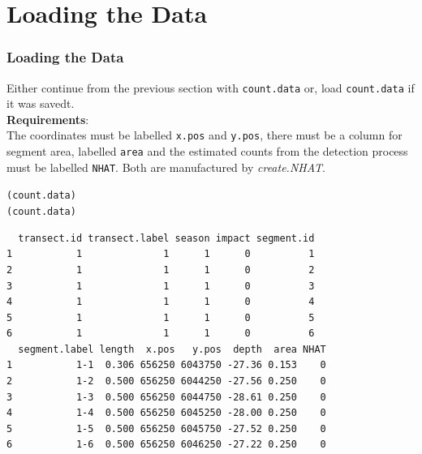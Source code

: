 \section{Loading the Data}
\begin{frame}[fragile]
\frametitle{Loading the Data}
Either continue from the previous section with {\tt count.data} or, load {\tt count.data} if it was savedt.\\

\noindent \textbf{Requirements}:\\

\noindent The coordinates must be labelled {\tt x.pos} and {\tt y.pos}, there must be a column for segment area, labelled {\tt area} and the estimated counts from the detection process must be labelled {\tt NHAT}. Both are manufactured by \textit{create.NHAT}.
\begin{knitrout}\footnotesize
{}\color{fgcolor}\begin{kframe}
\begin{alltt}
(count.data)
(count.data)
\end{alltt}
\begin{verbatim}
  transect.id transect.label season impact segment.id
1           1              1      1      0          1
2           1              1      1      0          2
3           1              1      1      0          3
4           1              1      1      0          4
5           1              1      1      0          5
6           1              1      1      0          6
  segment.label length  x.pos   y.pos  depth  area NHAT
1           1-1  0.306 656250 6043750 -27.36 0.153    0
2           1-2  0.500 656250 6044250 -27.56 0.250    0
3           1-3  0.500 656250 6044750 -28.61 0.250    0
4           1-4  0.500 656250 6045250 -28.00 0.250    0
5           1-5  0.500 656250 6045750 -27.52 0.250    0
6           1-6  0.500 656250 6046250 -27.22 0.250    0
\end{verbatim}
\end{kframe}
\end{knitrout}

\end{frame}

